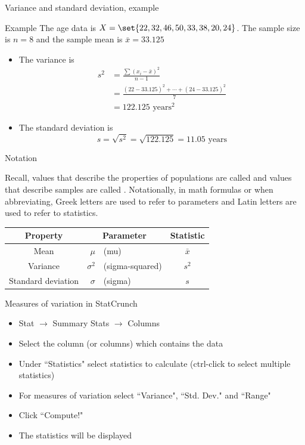 \documentclass[xcolor=table]{beamer}
\begin{document}
\begin{frame}{Variance and standard deviation, example}
\begin{exampleblock}{Example}
The age data is $X = \set{22, 32, 46, 50, 33, 38, 20, 24}$. The sample size is $n=8$ and the sample mean is $\bar x = 33.125$
\begin{itemize}
\pause
\item The variance is 
\begin{align*}
s^2 &= \frac{\sum (x_i - \bar x)^2}{n-1}\\
&= \frac{(22-33.125)^2 + \cdots + (24-33.125)^2}{7}\\
&= 122.125 \text{ years}^\text{2}
\end{align*}
\pause
\item The standard deviation is
\[s = \sqrt{s^2} = \sqrt{122.125} = 11.05 \text{ years}\]
\end{itemize}
\smallskip
\end{exampleblock}
\end{frame}



\begin{frame}{Notation}
\begin{block}{}
\large
Recall, values that describe the properties of populations are called  and values that describe samples are called . Notationally, in math formulas or when abbreviating, Greek letters are used to refer to parameters and Latin letters are used to refer to statistics.
\pause
\begin{center}
\begin{tabular}{c |r l | c}
Property & \multicolumn{2}{c|}{Parameter} & Statistic\\
\hline
Mean & $\mu$ & (mu) & $\bar x$\\
Variance & $\sigma^2$ &(sigma-squared) & $s^2$\\
Standard deviation & $\sigma$ &(sigma) & $s$
\end{tabular}
\end{center} 
\end{block}
\end{frame}

\begin{frame}{Measures of variation in StatCrunch}
\begin{block}{}
\begin{itemize}
\item Stat $\to$ Summary Stats $\to$ Columns
\item Select the column (or columns) which contains the data
\item Under ``Statistics" select statistics to calculate (ctrl-click to select multiple statistics)
\item For measures of variation select ``Variance", ``Std. Dev." and ``Range"
\item Click ``Compute!"
\item The statistics will be displayed
\end{itemize}
\end{block}

\end{frame}
\end{document}
